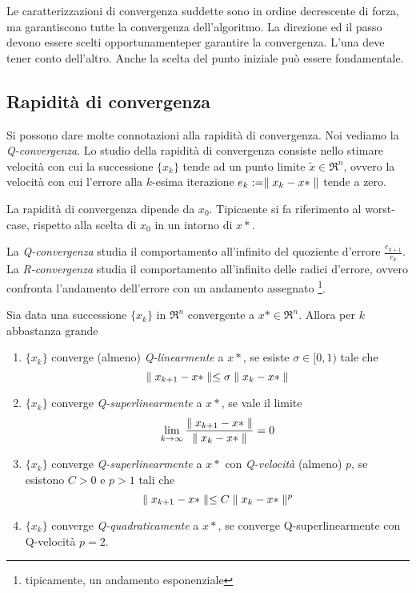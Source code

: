 Le caratterizzazioni di convergenza suddette sono in ordine decrescente di forza, ma garantiscono tutte la convergenza dell'algoritmo.
La direzione ed il passo devono essere scelti opportunamenteper garantire la convergenza. L'una deve tener conto dell'altro. Anche la scelta del punto iniziale può essere fondamentale.


\subsection{Rapidità di convergenza}

Si possono dare molte connotazioni alla rapidità di convergenza. Noi vediamo la \textit{Q-convergenza}.
Lo studio della rapidità di convergenza consiste nello stimare velocità con cui la successione $\{x_{k}\}$ tende ad un punto limite $\tilde{x}\in\Re^{n}$, ovvero la velocità con cui l'errore alla $k$-esima iterazione $e_{k}:=\parallel x_{k}-x* \parallel$ tende a zero.

La rapidità di convergenza dipende da $x_{0}$. Tipicaente si fa riferimento al worst-case, rispetto alla scelta di $x_{0}$ in un intorno di $x*$.

La \textit{Q-convergenza} studia il comportamento all'infinito del quoziente d'errore $\frac{e_{k+1}}{e_{k}}$.
La \textit{R-convergenza} studia il comportamento all'infinito delle radici d'errore, ovvero confronta l'andamento dell'errore con un andamento assegnato \footnote{tipicamente, un andamento esponenziale}.

\begin{definition}
	\label{dfn:q-convergence-velocity}
	Sia data una successione $\{x_{k}\}$ in $\Re^{n}$ convergente a $x*\in\Re^{n}$. Allora per $k$ abbastanza grande
	\begin{enumerate}

		\item $\{x_{k}\}$ converge (almeno) \textit{Q-linearmente} a $x*$, se esiste $\sigma\in[0,1)$ tale che
		\begin{equation}
		\parallel x_{k+1}-x* \parallel\leq \sigma\parallel x_{k}-x* \parallel
		\end{equation}

		\item $\{x_{k}\}$ converge \textit{Q-superlinearmente} a $x*$, se vale il limite
		\begin{equation}
		\lim_{k\rightarrow\infty}\frac{\parallel x_{k+1}-x* \parallel}{\parallel x_{k}-x* \parallel}=0
		\end{equation}

		\item $\{x_{k}\}$ converge \textit{Q-superlinearmente} a $x*$ con \textit{Q-velocità} (almeno) $p$, se esistono $C>0$ e $p>1$ tali che
		\begin{equation}
		\parallel x_{k+1}-x* \parallel\leq C\parallel x_{k}-x* \parallel^{p}
		\end{equation}

		\item $\{x_{k}\}$ converge \textit{Q-quadraticamente} a $x*$, se converge Q-superlinearmente con Q-velocità $p=2$.
	\end{enumerate}
\end{definition}

